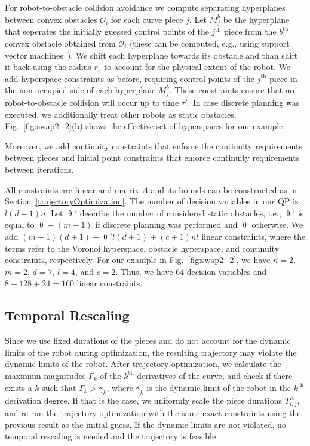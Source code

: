 \documentclass{svproc}
\newcommand{\cO}{\mathcal{O}}
\renewcommand{\th}{^{\text{th}}}
\begin{document}
For robot-to-obstacle collision avoidance we compute separating hyperplanes between convex obstacles $\cO_i$ for each curve piece $j$.
Let $M_j^b$ be the hyperplane that seperates the initially guessed control points of the $j\th$ piece from the $b\th$ convex obstacle obtained from $\cO_i$ (these can be computed, e.g., using support vector machines~\cite{SVM}).
We shift each hyperplane towards its obstacle and than shift it back using the radius $r_s$ to account for the physical extent of the robot.
We add hyperspace constraints as before, requiring control points of the $j\th$ piece in the non-occupied side of each hyperplane $M_j^b$.
These constraints ensure that no robot-to-obstacle collision will occur up to time $\tau'$.
In case discrete planning was executed, we additionally treat other robots as static obstacles.
Fig.~\ref{fig:swap2_2}(b) shows the effective set of hyperspaces for our example.

Moreover, we add continuity constraints that enforce the continuity requirements between pieces and initial point constraints that enforce continuity requirements between iterations.

All constraints are linear and matrix $A$ and its bounds can be constructed as in Section~\ref{trajectoryOptimization}.
The number of decision variables in our QP is $l(d+1)n$.
Let $\uptheta'$ describe the number of considered static obstacles, i.e., $\uptheta'$ is equal to $\uptheta + (m-1)$ if discrete planning was performed and $\uptheta$ otherwise.
We add $(m-1)(d+1) + \uptheta' l(d+1) + (c+1)nl$ linear constraints, where the terms refer to the Voronoi hyperspace, obstacle hyperspace, and continuity constraints, respectively.
For our example in Fig.~\ref{fig:swap2_2}, we have $n=2$, $m=2$, $d=7$, $l=4$, and $c=2$. Thus, we have 64 decision variables and $8 + 128 + 24 = 160$ linear constraints.

\subsection{Temporal Rescaling}  \label{temporalRescaling}
Since we use fixed durations of the pieces and do not account for the dynamic limits of the robot during optimization, the resulting trajectory may violate the dynamic limits of the robot.
After trajectory optimization, we calculate the maximum magnitudes $\Gamma_k$ of the $k\th$ derivatives of the curve, and check if there exists a $k$ such that $\Gamma_k > \gamma_k$, where $\gamma_k$ is the dynamic limit of the robot in the $k\th$ derivation degree.
If that is the case, we uniformly scale the piece durations $T^K_{i,j}$, and re-run the trajectory optimization with the same exact constraints using the previous result as the initial guess.
If the dynamic limits are not violated, no temporal rescaling is needed and the trajectory is feasible.
\end{document}
